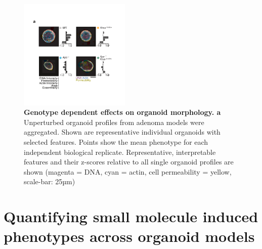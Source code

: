 \begin{flushleft}
\begin{figure}[h!]
\centering
\includegraphics[width=200,
                height=\textheight,
                keepaspectratio]{figures/adenomaprofiling/pdf/fig_1_3.pdf}
\caption{\textbf{Genotype dependent effects on organoid morphology. a} Unperturbed organoid profiles from adenoma models were aggregated. Shown are representative individual organoids with selected features. Points show the mean phenotype for each independent biological replicate. Representative, interpretable features and their z-scores relative to all single organoid profiles are shown (magenta = DNA, cyan = actin, cell permeability = yellow, scale-bar: 25µm)}
\label{fig_130}
\end{figure}
\bigbreak



\section{Quantifying small molecule induced phenotypes across organoid models}


\end{flushleft}
